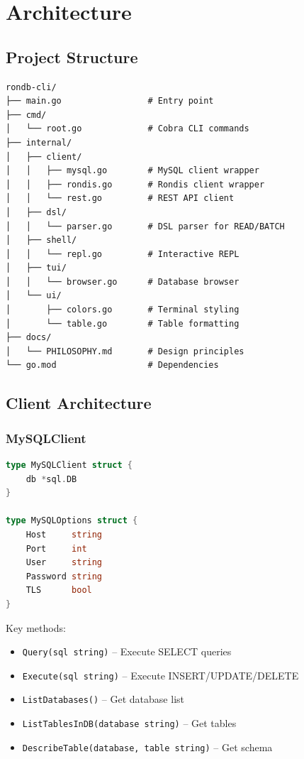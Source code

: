 \documentclass[11pt,a4paper]{report}
\begin{document}
\chapter{Architecture}

\section{Project Structure}

\begin{verbatim}
rondb-cli/
├── main.go                 # Entry point
├── cmd/
│   └── root.go             # Cobra CLI commands
├── internal/
│   ├── client/
│   │   ├── mysql.go        # MySQL client wrapper
│   │   ├── rondis.go       # Rondis client wrapper
│   │   └── rest.go         # REST API client
│   ├── dsl/
│   │   └── parser.go       # DSL parser for READ/BATCH
│   ├── shell/
│   │   └── repl.go         # Interactive REPL
│   ├── tui/
│   │   └── browser.go      # Database browser
│   └── ui/
│       ├── colors.go       # Terminal styling
│       └── table.go        # Table formatting
├── docs/
│   └── PHILOSOPHY.md       # Design principles
└── go.mod                  # Dependencies
\end{verbatim}

\section{Client Architecture}

\subsection{MySQLClient}

\begin{lstlisting}[language=Go]
type MySQLClient struct {
    db *sql.DB
}

type MySQLOptions struct {
    Host     string
    Port     int
    User     string
    Password string
    TLS      bool
}
\end{lstlisting}

Key methods:
\begin{itemize}
    \item \texttt{Query(sql string)} -- Execute SELECT queries
    \item \texttt{Execute(sql string)} -- Execute INSERT/UPDATE/DELETE
    \item \texttt{ListDatabases()} -- Get database list
    \item \texttt{ListTablesInDB(database string)} -- Get tables
    \item \texttt{DescribeTable(database, table string)} -- Get schema
\end{itemize}
\end{document}
